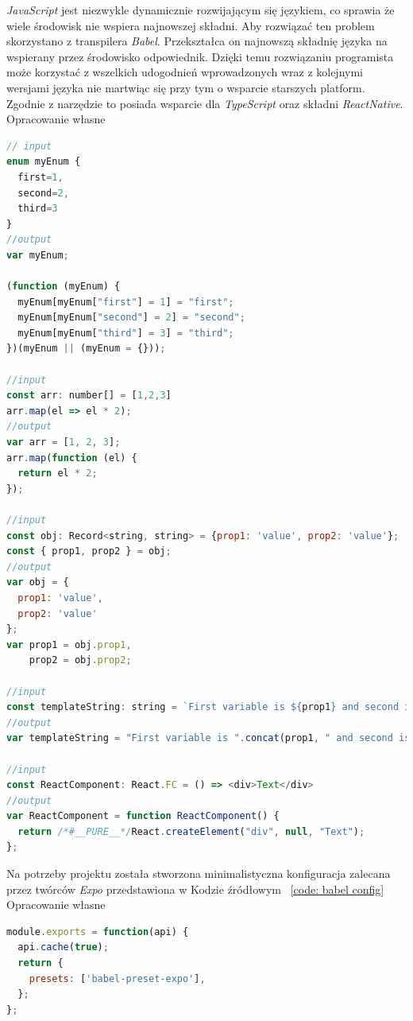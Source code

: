 \documentclass[skorowidz,skroty]{dyplomWEZUT}
\begin{document}
\textit{JavaScript} jest niezwykle dynamicznie rozwijającym się językiem, co sprawia że wiele środowisk nie wspiera najnowszej składni. Aby rozwiązać ten problem skorzystano z transpilera \textit{Babel}. Przekształca on najnowszą składnię języka na wspierany przez środowisko odpowiednik. Dzięki temu rozwiązaniu programista może korzystać z wszelkich udogodnień wprowadzonych wraz z kolejnymi wersjami języka nie martwiąc się przy tym o wsparcie starszych platform. Zgodnie z \cite{Babel} narzędzie to posiada wsparcie dla \textit{TypeScript} oraz składni \textit{ReactNative}.  
{Opracowanie własne}{\label{code: babel}}
\begin{lstlisting}[language=JavaScript]
// input
enum myEnum {
  first=1,
  second=2,
  third=3
}
//output 
var myEnum;

(function (myEnum) {
  myEnum[myEnum["first"] = 1] = "first";
  myEnum[myEnum["second"] = 2] = "second";
  myEnum[myEnum["third"] = 3] = "third";
})(myEnum || (myEnum = {}));

//input 
const arr: number[] = [1,2,3]
arr.map(el => el * 2);
//output 
var arr = [1, 2, 3];
arr.map(function (el) {
  return el * 2;
});

//input 
const obj: Record<string, string> = {prop1: 'value', prop2: 'value'};
const { prop1, prop2 } = obj;
//output 
var obj = {
  prop1: 'value',
  prop2: 'value'
};
var prop1 = obj.prop1,
    prop2 = obj.prop2;    
    
//input
const templateString: string = `First variable is ${prop1} and second is ${prop2}`;
//output
var templateString = "First variable is ".concat(prop1, " and second is ").concat(prop2);

//input
const ReactComponent: React.FC = () => <div>Text</div>
//output
var ReactComponent = function ReactComponent() {
  return /*#__PURE__*/React.createElement("div", null, "Text");
};

\end{lstlisting}
Na potrzeby projektu została stworzona minimalistyczna konfiguracja zalecana przez twórców \textit{Expo} przedstawiona w Kodzie źródłowym ~\ref{code: babel config}
{Opracowanie własne}{\label{code: babel config}}
\begin{lstlisting}[language=JavaScript]
module.exports = function(api) {
  api.cache(true);
  return {
    presets: ['babel-preset-expo'],
  };
};
\end{lstlisting}
\end{document}
